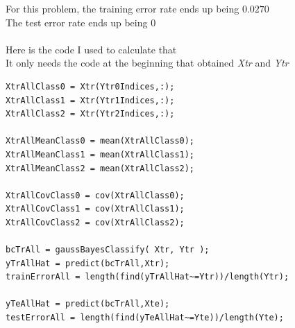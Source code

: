 \documentclass[11pt,psfig]{article}
\begin{document}
For this problem, the training error rate ends up being $0.0270$\\
The test error rate ends up being $0$\\
\\
Here is the code I used to calculate that\\
It only needs the code at the beginning that obtained {\it Xtr} and {\it Ytr}
\begin{verbatim}
XtrAllClass0 = Xtr(Ytr0Indices,:);
XtrAllClass1 = Xtr(Ytr1Indices,:);
XtrAllClass2 = Xtr(Ytr2Indices,:);

XtrAllMeanClass0 = mean(XtrAllClass0);
XtrAllMeanClass1 = mean(XtrAllClass1);
XtrAllMeanClass2 = mean(XtrAllClass2);

XtrAllCovClass0 = cov(XtrAllClass0);
XtrAllCovClass1 = cov(XtrAllClass1);
XtrAllCovClass2 = cov(XtrAllClass2);

bcTrAll = gaussBayesClassify( Xtr, Ytr );
yTrAllHat = predict(bcTrAll,Xtr);
trainErrorAll = length(find(yTrAllHat~=Ytr))/length(Ytr);

yTeAllHat = predict(bcTrAll,Xte);
testErrorAll = length(find(yTeAllHat~=Yte))/length(Yte);
\end{verbatim}
\end{document}
